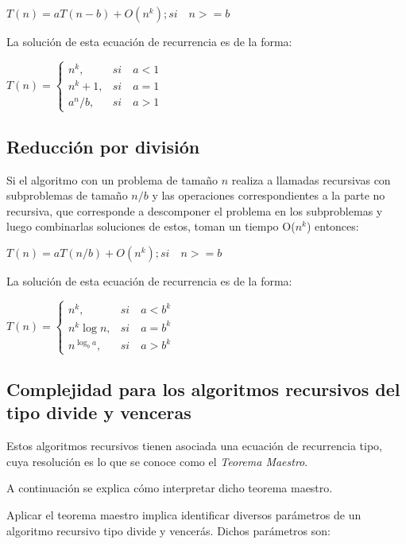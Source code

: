$T(n) = a T(n-b) + O(n^k)  ;  si \quad  n >= b$


La solución de esta ecuación de recurrencia es de la forma: 


\begin{math}
	T(n)=\left\{
	\begin{array}{ll}
		n^k, & si \quad a < 1\\
		n^k+1, & si \quad a = 1\\
		a^n/b, & si \quad a > 1
	\end{array}
	\right.
\end{math}



\subsection{Reducción por división}

Si el algoritmo con un problema de tamaño $n$ realiza a llamadas recursivas con subproblemas de tamaño $n/b$ y las operaciones correspondientes a la parte no recursiva, que corresponde a descomponer el problema en los subproblemas y luego combinarlas soluciones de estos, toman un tiempo O($n^k$) entonces: 

$T(n) = aT(n/b) + O(n^k)   ;   si \quad n >= b$

La solución de esta ecuación de recurrencia es de la forma:

\begin{math}
	T(n)=\left\{
	\begin{array}{ll}
		n^k, & si \quad  a < b^k\\
	    n^k \log n , & si \quad a = b^k\\
	   n^{\log_{b} a}, & si \quad a > b^k
	\end{array}
	\right.
\end{math}

\subsection{Complejidad para los algoritmos recursivos del tipo divide y venceras}
Estos algoritmos recursivos tienen asociada una ecuación de recurrencia tipo, cuya resolución
es lo que se conoce como el \emph{Teorema Maestro}.

A continuación se explica cómo interpretar dicho teorema maestro.

Aplicar el teorema maestro implica identificar diversos parámetros de un algoritmo recursivo
tipo divide y vencerás. Dichos parámetros son:

